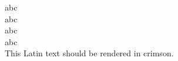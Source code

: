 \documentclass{article}
\begin{document}
abc𛀐𛀑𛀒𛀓𛀔𛀕𛀖𛀗𛀘𛀙𛀚𛀛𛀜𛀝𛀞𛀟\\
abc𛀙゙「𛀬゙𛀰゙」𛀸゙𛀿゙𛁅゙𛁈゙𛁛\\
abc𛀙゙「𛀬゙𛀰゙」𛀸゙𛀿゙𛁅゙𛁈゙𛁛\\
abc𛂞゚𛂟゚𛂠゚𛂡゚𛂢゚𛂣゚𛂤゚𛂥゚𛂦゚𛂧゚𛂨゚\\
This Latin text should be rendered in crimson.
\end{document}
